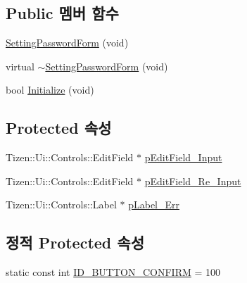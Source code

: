 \subsection*{Public 멤버 함수}
\begin{DoxyCompactItemize}
\item 
\hyperlink{class_setting_password_form_ab06444391f0876266895364522154229}{Setting\+Password\+Form} (void)
\item 
virtual \hyperlink{class_setting_password_form_ac18c4d2f162db5c6e6061e8f6d530b30}{$\sim$\+Setting\+Password\+Form} (void)
\item 
bool \hyperlink{class_setting_password_form_ace791336d606d28535b440aeafc18fff}{Initialize} (void)
\end{DoxyCompactItemize}
\subsection*{Protected 속성}
\begin{DoxyCompactItemize}
\item 
Tizen\+::\+Ui\+::\+Controls\+::\+Edit\+Field $\ast$ \hyperlink{class_setting_password_form_a2cd9d5f0b6101f19f47dbf6c6d268d71}{p\+Edit\+Field\+\_\+\+Input}
\item 
Tizen\+::\+Ui\+::\+Controls\+::\+Edit\+Field $\ast$ \hyperlink{class_setting_password_form_a45848a36b44d294a9e7ddd1d921c990d}{p\+Edit\+Field\+\_\+\+Re\+\_\+\+Input}
\item 
Tizen\+::\+Ui\+::\+Controls\+::\+Label $\ast$ \hyperlink{class_setting_password_form_a2cddadd3fdd619dc859566a6fde37c23}{p\+Label\+\_\+\+Err}
\end{DoxyCompactItemize}
\subsection*{정적 Protected 속성}
\begin{DoxyCompactItemize}
\item 
static const int \hyperlink{class_setting_password_form_ac831ee19d4e476224c2ee4bd87df8a0b}{I\+D\+\_\+\+B\+U\+T\+T\+O\+N\+\_\+\+C\+O\+N\+F\+I\+R\+M} = 100
\end{DoxyCompactItemize}
